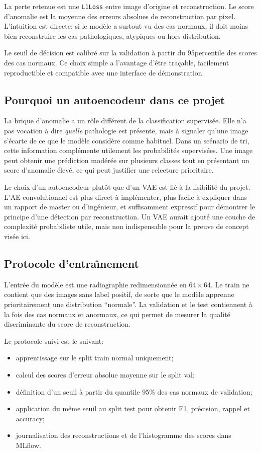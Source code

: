 \documentclass[11pt,a4paper]{article}
\begin{document}
La perte retenue est une \texttt{L1Loss} entre image d'origine et reconstruction. Le score d'anomalie est la moyenne des erreurs absolues de reconstruction par pixel. L'intuition est directe: si le mod\`ele a surtout vu des cas normaux, il doit moins bien reconstruire les cas pathologiques, atypiques ou hors distribution.

Le seuil de d\'ecision est calibr\'e sur la validation \`a partir du 95\ieme percentile des scores des cas normaux. Ce choix simple a l'avantage d'\^etre tra\c{c}able, facilement reproductible et compatible avec une interface de d\'emonstration.

\subsection{Pourquoi un autoencodeur dans ce projet}
La brique d'anomalie a un r\^ole diff\'erent de la classification supervis\'ee. Elle n'a pas vocation \`a dire \emph{quelle} pathologie est pr\'esente, mais \`a signaler qu'une image s'\'ecarte de ce que le mod\`ele consid\`ere comme habituel. Dans un sc\'enario de tri, cette information compl\'emente utilement les probabilit\'es supervis\'ees. Une image peut obtenir une pr\'ediction mod\'er\'ee sur plusieurs classes tout en pr\'esentant un score d'anomalie \'elev\'e, ce qui peut justifier une relecture prioritaire.

Le choix d'un autoencodeur plut\^ot que d'un VAE est li\'e \`a la lisibilit\'e du projet. L'AE convolutionnel est plus direct \`a impl\'ementer, plus facile \`a expliquer dans un rapport de master ou d'ing\'enieur, et suffisamment expressif pour d\'emontrer le principe d'une d\'etection par reconstruction. Un VAE aurait ajout\'e une couche de complexit\'e probabiliste utile, mais non indispensable pour la preuve de concept vis\'ee ici.

\subsection{Protocole d'entra\^\i nement}
L'entr\'ee du mod\`ele est une radiographie redimensionn\'ee en 64\,$\times$\,64. Le train ne contient que des images sans label positif, de sorte que le mod\`ele apprenne prioritairement une distribution ``normale''. La validation et le test contiennent \`a la fois des cas normaux et anormaux, ce qui permet de mesurer la qualit\'e discriminante du score de reconstruction.

Le protocole suivi est le suivant:
\begin{itemize}
    \item apprentissage sur le split train normal uniquement;
    \item calcul des scores d'erreur absolue moyenne sur le split val;
    \item d\'efinition d'un seuil \`a partir du quantile 95\% des cas normaux de validation;
    \item application du m\^eme seuil au split test pour obtenir F1, pr\'ecision, rappel et accuracy;
    \item journalisation des reconstructions et de l'histogramme des scores dans MLflow.
\end{itemize}
\end{document}
